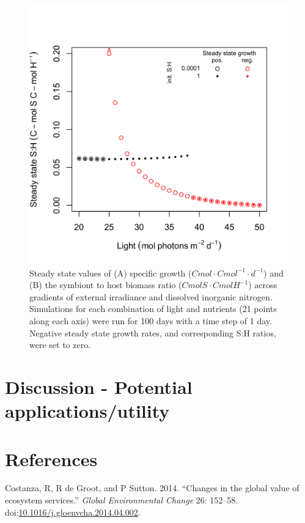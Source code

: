 \documentclass[]{elsarticle} %
\makeatletter
\def\maxwidth{\ifdim\Gin@nat@width>\linewidth\linewidth
\else\Gin@nat@width\fi}
\let\Oldincludegraphics\includegraphics
\renewcommand{\includegraphics}[1]{\Oldincludegraphics[width=\maxwidth]{#1}}
\makeatother
\begin{document}
\begin{figure}[htbp]
\centering
\includegraphics{../img/Fig2.png}
\caption{Steady state values of (A) specific growth
(\(Cmol \cdot Cmol^{-1} \cdot d^{-1}\)) and (B) the symbiont to host
biomass ratio (\(CmolS \cdot CmolH^{-1}\)) across gradients of external
irradiance and dissolved inorganic nitrogen. Simulations for each
combination of light and nutrients (21 points along each axis) were run
for 100 days with a time step of 1 day. Negative steady state growth
rates, and corresponding S:H ratios, were set to zero.}
\end{figure}

\section{Discussion - Potential
applications/utility}\label{discussion---potential-applicationsutility}

\section*{References}\label{references}

\hypertarget{refs}{}
\hypertarget{ref-Costanza:2014ex}{}
Costanza, R, R de Groot, and P Sutton. 2014. ``Changes in the global
value of ecosystem services.'' \emph{Global Environmental Change} 26:
152--58.
doi:\href{https://doi.org/10.1016/j.gloenvcha.2014.04.002}{10.1016/j.gloenvcha.2014.04.002}.
\end{document}
